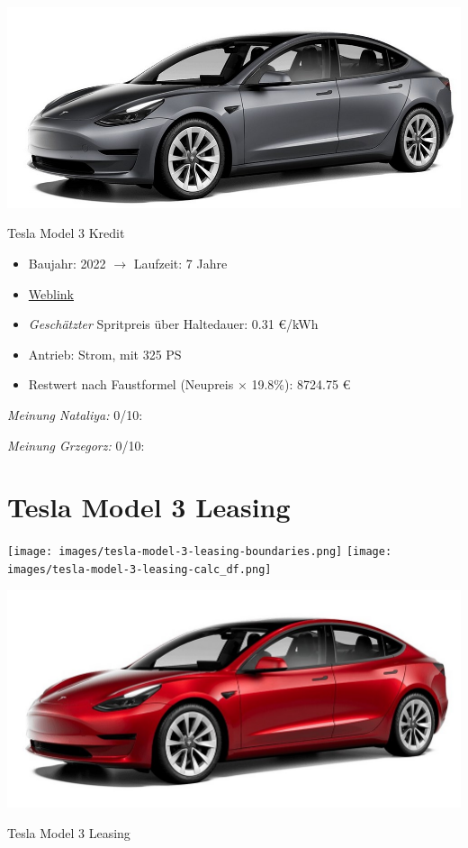 \documentclass[landscape, DIV=99, 14pt]{scrartcl}
\begin{document}
\pagebreak
\begin{center}
\includegraphics[width=0.9\columnwidth]{cars/tesla-model-3.jpg}

Tesla Model 3 Kredit
\end{center}

\begin{itemize}
    \item Baujahr: 2022 $\rightarrow$ Laufzeit: 7 Jahre
    \item \href{https://www.tesla.com/de_de/model3/design\#overview}{Weblink}
    \item \emph{Gesch\"atzter} Spritpreis \"uber Haltedauer: 0.31 \euro{}/kWh
    \item Antrieb: Strom, mit 325 PS
    \item Restwert nach Faustformel (Neupreis $\times$ 19.8\%): 8724.75 \euro{}
\end{itemize}

\begin{small}
\emph{Meinung Nataliya:} 0/10: 
        
\emph{Meinung Grzegorz:} 0/10: 
\end{small}

\pagebreak


\twocolumn

\section*{Tesla Model 3 Leasing}
\begin{center}
\texttt{[image: images/tesla-model-3-leasing-boundaries.png]}
\null
\vspace{0.5cm}
\texttt{[image: images/tesla-model-3-leasing-calc\_df.png]}
\end{center}

\pagebreak
\begin{center}
\includegraphics[width=0.9\columnwidth]{cars/tesla-model-3-leasing.jpg}

Tesla Model 3 Leasing
\end{center}
\end{document}
